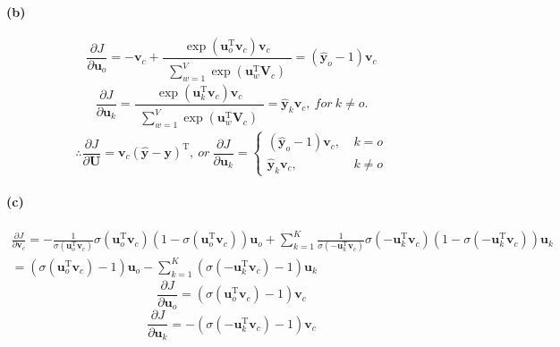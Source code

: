 \documentclass{article}
\begin{document}
\begin{spacing}{1.5}
\paragraph{(b)}
\begin{equation}
\frac{\partial J}{\partial \boldsymbol{u}_o}=-\boldsymbol{v}_c+ \frac{\exp(\boldsymbol{u}_o ^\mathrm{T}\boldsymbol{v}_c)\boldsymbol{v}_c}{\begin{matrix} \sum_{w=1}^V\exp(\boldsymbol{u}_w ^\mathrm{T}\boldsymbol{V}_c) \end{matrix}}=(\boldsymbol{\widehat{y}}_{o}-1)\boldsymbol{v}_c
\end{equation}
\begin{equation}
\frac{\partial J}{\partial \boldsymbol{u}_k}=\frac{\exp(\boldsymbol{u}_k ^\mathrm{T}\boldsymbol{v}_c)\boldsymbol{v}_c}{\begin{matrix} \sum_{w=1}^V\exp(\boldsymbol{u}_w ^\mathrm{T}\boldsymbol{V}_c) \end{matrix}}=\boldsymbol{\widehat{y}}_{k}\boldsymbol{v}_c,\ for \ k \neq o .
\end{equation}
\begin{equation}
\boldsymbol{\therefore}
\frac{\partial J}{\partial \boldsymbol{U}}=\boldsymbol{v}_c (\boldsymbol{\widehat{y}}-\boldsymbol{y})^\mathrm{T},\ or \ 
\frac{\partial J}{\partial \boldsymbol{u}_k}=
\begin{cases} (\boldsymbol{\widehat{y}}_{o}-1)\boldsymbol{v}_c,\ &k=o \\ \boldsymbol{\widehat{y}}_{k}\boldsymbol{v}_c,\ &k \neq o \end{cases}
\end{equation}
\paragraph{(c)}
\begin{equation}
\begin{split}
\frac {\partial J}{\partial \boldsymbol{v}_c}=-\frac{1}{\sigma(\boldsymbol{u}_o ^\mathrm{T}\boldsymbol{v}_c)} \sigma(\boldsymbol{u}_o ^\mathrm{T}\boldsymbol{v}_c) (1-\sigma(\boldsymbol{u}_o ^\mathrm{T}\boldsymbol{v}_c)) \boldsymbol{u}_o
+ \sum_{k=1}^K \frac{1}{\sigma(-\boldsymbol{u}_k ^\mathrm{T}\boldsymbol{v}_c)} \sigma(-\boldsymbol{u}_k ^\mathrm{T}\boldsymbol{v}_c)(1-\sigma(-\boldsymbol{u}_k ^\mathrm{T}\boldsymbol{v}_c)) \boldsymbol{u}_k \\
=(\sigma(\boldsymbol{u}_o ^\mathrm{T}\boldsymbol{v}_c)-1) \boldsymbol{u}_o
-\sum_{k=1}^K(\sigma(-\boldsymbol{u}_k ^\mathrm{T}\boldsymbol{v}_c)-1) \boldsymbol{u}_k
\end{split}
\end{equation}
\begin{equation}
\frac {\partial J}{\partial \boldsymbol{u}_o}=(\sigma(\boldsymbol{u}_o ^\mathrm{T}\boldsymbol{v}_c)-1)\boldsymbol{v}_c
\end{equation}
\begin{equation}
\frac {\partial J}{\partial \boldsymbol{u}_k}=-(\sigma(-\boldsymbol{u}_k ^\mathrm{T}\boldsymbol{v}_c)-1)\boldsymbol{v}_c
\end{equation}

\end{spacing}
\end{document}
